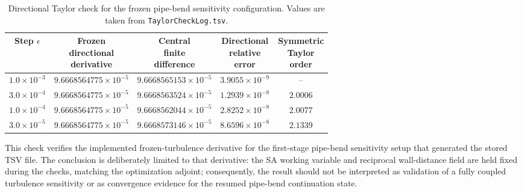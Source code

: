 \begin{table}[!ht]
	\centering
	\scriptsize
	\caption{Directional Taylor check for the frozen pipe-bend sensitivity configuration. Values are taken from \texttt{TaylorCheckLog.tsv}.}
	\label{tab:alexandersen_pipebend_taylor_check}
	\renewcommand{\arraystretch}{1.2}
	\begin{tabular}{c c c c c}
		\hline
		\textbf{Step $\epsilon$} &
		\shortstack{\textbf{Frozen}\\\textbf{directional}\\\textbf{derivative}} &
		\shortstack{\textbf{Central}\\\textbf{finite}\\\textbf{difference}} &
		\shortstack{\textbf{Directional}\\\textbf{relative}\\\textbf{error}} &
		\shortstack{\textbf{Symmetric}\\\textbf{Taylor}\\\textbf{order}} \\
		\hline
		$1.0\times10^{-3}$ & $9.6668564775\times10^{-5}$ & $9.6668565153\times10^{-5}$ & $3.9055\times10^{-9}$ & -- \\
		$3.0\times10^{-4}$ & $9.6668564775\times10^{-5}$ & $9.6668563524\times10^{-5}$ & $1.2939\times10^{-8}$ & $2.0006$ \\
		$1.0\times10^{-4}$ & $9.6668564775\times10^{-5}$ & $9.6668562044\times10^{-5}$ & $2.8252\times10^{-8}$ & $2.0077$ \\
		$3.0\times10^{-5}$ & $9.6668564775\times10^{-5}$ & $9.6668573146\times10^{-5}$ & $8.6596\times10^{-8}$ & $2.1339$ \\
		\hline
	\end{tabular}
\end{table}

		This check verifies the implemented frozen-turbulence derivative for the first-stage pipe-bend sensitivity setup that generated the stored TSV file. The conclusion is deliberately limited to that derivative: the SA working variable and reciprocal wall-distance field are held fixed during the checks, matching the optimization adjoint; consequently, the result should not be interpreted as validation of a fully coupled turbulence sensitivity or as convergence evidence for the resumed pipe-bend continuation state.

\FloatBarrier

